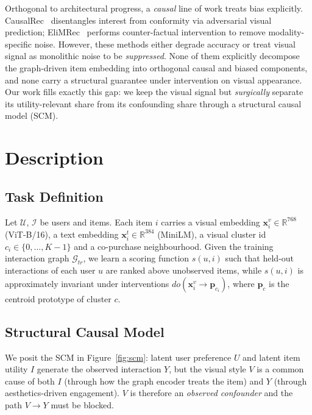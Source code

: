 \documentclass[12pt,a4paper]{article}
\begin{document}
Orthogonal to architectural progress, a \emph{causal} line of work treats bias
explicitly. CausalRec~\citep{qiu2021causalrec} disentangles interest from conformity via
adversarial visual prediction; EliMRec~\citep{liu2022elimrec} performs counter-factual
intervention to remove modality-specific noise. However, these methods either degrade
accuracy or treat visual signal as monolithic noise to be \emph{suppressed}. None of
them explicitly decompose the graph-driven item embedding into orthogonal causal and
biased components, and none carry a structural guarantee under intervention on visual
appearance. Our work fills exactly this gap: we keep the visual signal but
\emph{surgically} separate its utility-relevant share from its confounding share through
a structural causal model (SCM).

\section{Description}

\subsection{Task Definition}
Let $\mathcal{U}$, $\mathcal{I}$ be users and items. Each item $i$ carries a visual
embedding $\mathbf{x}_i^{v}\!\in\!\mathbb{R}^{768}$ (ViT-B/16), a text embedding
$\mathbf{x}_i^{t}\!\in\!\mathbb{R}^{384}$ (MiniLM), a visual cluster id
$c_i\!\in\!\{0,\dots,K-1\}$ and a co-purchase neighbourhood. Given the training
interaction graph $\mathcal{G}_{tr}$, we learn a scoring function $s(u,i)$ such that
held-out interactions of each user $u$ are ranked above unobserved items, while
$s(u,i)$ is approximately invariant under interventions $do(\mathbf{x}_i^v\!\to\!\mathbf{p}_{c_i})$,
where $\mathbf{p}_{c}$ is the centroid prototype of cluster $c$.

\subsection{Structural Causal Model}
We posit the SCM in Figure~\ref{fig:scm}: latent user preference $U$ and latent item
utility $I$ generate the observed interaction $Y$, but the visual style $V$ is a
common cause of both $I$ (through how the graph encoder treats the item) and $Y$
(through aesthetics-driven engagement). $V$ is therefore an \emph{observed confounder}
and the path $V\!\to\!Y$ must be blocked.
\end{document}
